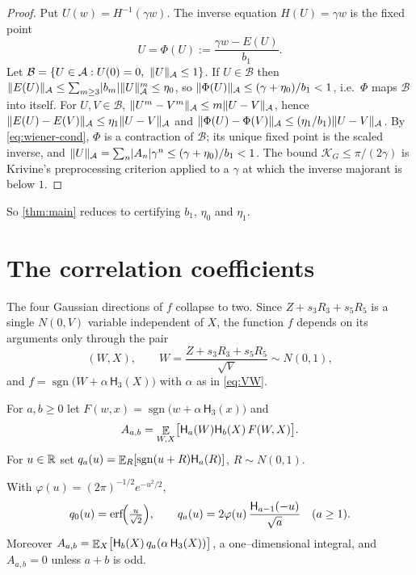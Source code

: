 \documentclass[12pt]{article}
\providecommand{\KG}{\mathcal{K}_G}
\providecommand{\sgn}{\operatorname{sgn}}
\providecommand{\erf}{\operatorname{erf}}
\newcommand{\He}{\mathsf{H}}                 %
\newcommand{\gam}{\gamma}
\providecommand{\cB}{\mathcal B}
\begin{document}
\begin{proof}
Put $U(w)=H^{-1}(\gam w)$.  The inverse equation $H(U)=\gam w$ is the fixed point
\[
   U=\Phi(U):=\frac{\gam w-E(U)}{b_1}.
\]
Let $\cB=\{U\in\cA:U(0)=0,\ \norm{U}_{\cA}\le1\}$.  If $U\in\cB$ then
$\lVert E(U)\rVert_{\mathcal{A}}\le\sum_{m\ge3}\lvert b_m\rvert\lVert U\rVert_{\mathcal{A}}^m\le\eta_0$, so
$\norm{\Phi(U)}_{\cA}\le(\gam+\eta_0)/b_1<1$, i.e.\ $\Phi$ maps $\cB$ into
itself.  For $U,V\in\cB$, $\lVert U^m-V^m\rVert_{\mathcal{A}}\le m\lVert U-V\rVert_{\mathcal{A}}$, hence
$\lVert E(U)-E(V)\rVert_{\mathcal{A}}\le\eta_1\lVert U-V\rVert_{\mathcal{A}}$ and
$\lVert\Phi(U)-\Phi(V)\rVert_{\mathcal{A}}\le(\eta_1/b_1)\lVert U-V\rVert_{\mathcal{A}}$.  By
\eqref{eq:wiener-cond}, $\Phi$ is a contraction of $\cB$; its unique fixed
point is the scaled inverse, and
$\norm{U}_{\cA}=\sum_n\abs{A_n}\gam^n\le(\gam+\eta_0)/b_1<1$.  The bound
$\KG\le\pi/(2\gam)$ is Krivine's preprocessing criterion applied to a $\gam$ at
which the inverse majorant is below $1$.
\end{proof}

So \cref{thm:main} reduces to certifying $b_1$, $\eta_0$ and $\eta_1$.

\section{The correlation coefficients}\label{sec:reduction}

The four Gaussian directions of $f$ collapse to two.  Since $Z+s_3R_3+s_5R_5$ is
a single $N(0,V)$ variable independent of $X$, the function $f$ depends on its
arguments only through the pair
\[
   (W,X),\qquad W=\frac{Z+s_3R_3+s_5R_5}{\sqrt V}\sim N(0,1),
\]
and $f=\sgn\!\bigl(W+\alpha\,\He_3(X)\bigr)$ with $\alpha$ as in \eqref{eq:VW}.

\begin{definition}\label{def:Aab}
For $a,b\ge0$ let $F(w,x)=\sgn\!\bigl(w+\alpha\,\He_3(x)\bigr)$ and
\begin{equation}\label{eq:Aab}
   A_{a,b}=\E_{W,X}\bigl[\He_a(W)\He_b(X)\,F(W,X)\bigr].
\end{equation}
For $u\in\mathbb{R}$ set $q_a(u)=\E_R[\sgn(u+R)\He_a(R)]$, $R\sim N(0,1)$.
\end{definition}

\begin{lemma}\label{lem:qa}
With $\varphi(u)=(2\pi)^{-1/2}e^{-u^2/2}$,
\[
   q_0(u)=\erf\!\Bigl(\tfrac{u}{\sqrt2}\Bigr),\qquad
   q_a(u)=2\varphi(u)\,\frac{\He_{a-1}(-u)}{\sqrt a}\quad(a\ge1).
\]
Moreover $A_{a,b}=\E_X\bigl[\He_b(X)\,q_a(\alpha\,\He_3(X))\bigr]$, a
one--dimensional integral, and $A_{a,b}=0$ unless $a+b$ is odd.
\end{lemma}
\end{document}
